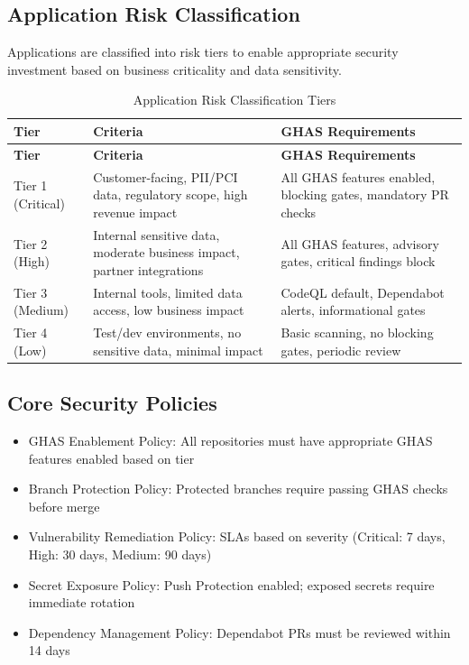 \documentclass[11pt]{article}
\begin{document}
\subsection{Application Risk Classification}

Applications are classified into risk tiers to enable appropriate security investment based on business criticality and data sensitivity.

\begin{longtable}{p{}p{}p{}}
\caption{Application Risk Classification Tiers}\label{tab:risk_tiers}\\
\toprule
\textbf{Tier} & \textbf{Criteria} & \textbf{GHAS Requirements} \\
\midrule
\endfirsthead
\toprule
\textbf{Tier} & \textbf{Criteria} & \textbf{GHAS Requirements} \\
\midrule
\endhead
\bottomrule
\endfoot
Tier 1 (Critical) & Customer-facing, PII/PCI data, regulatory scope, high revenue impact & All GHAS features enabled, blocking gates, mandatory PR checks \\
Tier 2 (High) & Internal sensitive data, moderate business impact, partner integrations & All GHAS features, advisory gates, critical findings block \\
Tier 3 (Medium) & Internal tools, limited data access, low business impact & CodeQL default, Dependabot alerts, informational gates \\
Tier 4 (Low) & Test/dev environments, no sensitive data, minimal impact & Basic scanning, no blocking gates, periodic review \\
\end{longtable}

\subsection{Core Security Policies}

\begin{itemize}[leftmargin=*]
\item GHAS Enablement Policy: All repositories must have appropriate GHAS features enabled based on tier
\item Branch Protection Policy: Protected branches require passing GHAS checks before merge
\item Vulnerability Remediation Policy: SLAs based on severity (Critical: 7 days, High: 30 days, Medium: 90 days)
\item Secret Exposure Policy: Push Protection enabled; exposed secrets require immediate rotation
\item Dependency Management Policy: Dependabot PRs must be reviewed within 14 days
\end{itemize}
\end{document}
